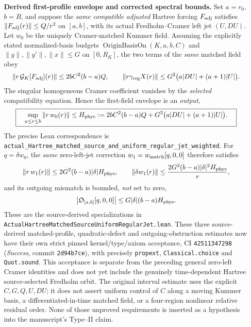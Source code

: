 \documentclass[11pt]{amsart}
\begin{document}
\medskip
\noindent\textbf{Derived first-profile envelope and corrected spectral bounds.}
Set $a=r_0$, $b=B$, and suppose the \emph{same compatible adjusted}
Hartree forcing $F_{\rm adj}$ satisfies
$\|F_{\rm adj}(r)\|\le Q/r^2$ on $[a,b]$, with its actual
Fredholm--Cramer left jet $(U,DU)$.  Let $w_0$ be the uniquely
Cramer-matched Kummer field.  Assuming the explicitly stated
normalized-basis budgets
$\operatorname{OriginBasisOn}(K,a,b,C)$ and
$\|y\|,\|y'\|,\|x\|\le G$ on $[0,R_K]$, the two terms of the
\emph{same} matched field obey
\[
 \|r\,\mathcal G_K[F_{\rm adj}](r)\|
 \le 2bC^2(b-a)Q,\qquad
 \|r\gamma_{\rm reg}X(r)\|
 \le G^2\bigl(a|DU|+(a+1)|U|\bigr).
\]
The singular homogeneous Cramer coefficient vanishes by the
\emph{selected} compatibility equation.  Hence the first-field
envelope is an \emph{output},
\[
 \boxed{\quad
 \sup_{a\le r\le b}\|r\,w_0(r)\|
 \le H_{\rm phys}:=
  2bC^2(b-a)Q+
  G^2\bigl(a|DU|+(a+1)|U|\bigr).\quad}
\]
The precise Lean correspondence is
\texttt{actual\_Hartree\_matched\_source\_and\_uniform\_regular\_jet\_weighted}.
For $q=\delta w_0$, the \emph{same} zero-left-jet correction
$w_1=w_{\rm match}[q,0,0]$ therefore satisfies
\[
 \|r\,w_1(r)\|\le 2G^2(b-a)|\delta|H_{\rm phys},
 \qquad
 \|\delta w_1(r)\|\le
  \frac{2G^2(b-a)|\delta|^2H_{\rm phys}}r,
\]
and its outgoing mismatch is bounded, \emph{not} set to zero,
\[
 \left|\mathfrak O_{[a,b]}[q,0,0]\right|
 \le G|\delta|(b-a)H_{\rm phys}.
\]
These are the source-derived specializations in
\texttt{ActualHartreeMatchedSourceUniformRegularJet.lean}.
These three source-derived matched-profile, quadratic-defect and
outgoing-obstruction estimates now have their own strict pinned
kernel/type/axiom acceptance, CI \texttt{42511347298}
(\emph{Success}, commit \texttt{2d94b7ce}), with precisely
\texttt{propext}, \texttt{Classical.choice} and \texttt{Quot.sound}.
This acceptance is separate from the preceding general
zero-left Cramer identities and does not yet include the genuinely
time-dependent Hartree source-selected Fredholm orbit.
The original interval estimate uses the explicit $C,G,Q,U,DU$;
it does not assert uniform control of $C$ along a moving Kummer basis,
a differentiated-in-time matched field, or a four-region nonlinear
relative residual order.  None of those unproved requirements is
inserted as a hypothesis into the manuscript's Type--II claim.
\end{document}
